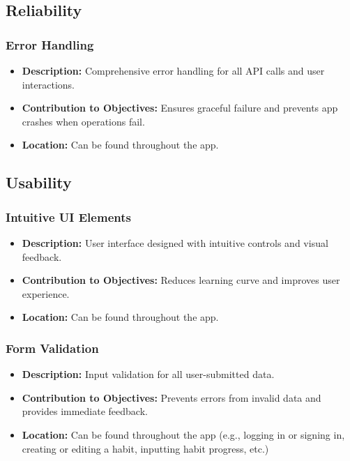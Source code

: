 \subsection{Reliability}
\subsubsection{Error Handling}
\begin{itemize}
    \item \textbf{Description:} Comprehensive error handling for all API calls and user interactions.
    \item \textbf{Contribution to Objectives:} Ensures graceful failure and prevents app crashes when operations fail.
    \item \textbf{Location:} Can be found throughout the app.
\end{itemize}

\subsection{Usability}
\subsubsection{Intuitive UI Elements}
\begin{itemize}
    \item \textbf{Description:} User interface designed with intuitive controls and visual feedback.
    \item \textbf{Contribution to Objectives:} Reduces learning curve and improves user experience.
    \item \textbf{Location:} Can be found throughout the app.
\end{itemize}

\subsubsection{Form Validation}
\begin{itemize}
    \item \textbf{Description:} Input validation for all user-submitted data.
    \item \textbf{Contribution to Objectives:} Prevents errors from invalid data and provides immediate feedback.
    \item \textbf{Location:} Can be found throughout the app (e.g., logging in or signing in, creating or editing a habit, inputting habit progress, etc.)
\end{itemize}

